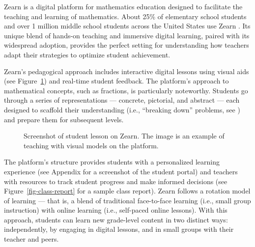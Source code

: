\documentclass[
  number,
  preprint,
  3p,
  onecolumn]{elsarticle}
\begin{document}
Zearn is a digital platform for mathematics education designed to
facilitate the teaching and learning of mathematics. About 25\% of
elementary school students and over 1 million middle school students
across the United States use Zearn \citep{post-weblog}. Its unique blend
of hands-on teaching and immersive digital learning, paired with its
widespread adoption, provides the perfect setting for understanding how
teachers adapt their strategies to optimize student achievement.

Zearn's pedagogical approach includes interactive digital lessons using
visual aids (see Figure~\ref{fig-zearn-poster}) and real-time student
feedback. The platform's approach to mathematical concepts, such as
fractions, is particularly noteworthy. Students go through a series of
representations --- concrete, pictorial, and abstract --- each designed
to scaffold their understanding (i.e., ``breaking down'' problems, see
\citep{jumaat2014, reiser2014}) and prepare them for subsequent levels.

\begin{figure}


\caption{\label{fig-zearn-poster}Screenshot of student lesson on Zearn.
The image is an example of teaching with visual models on the platform.}

\end{figure}%

The platform's structure provides students with a personalized learning
experience (see Appendix for a screenshot of the student portal) and
teachers with resources to track student progress and make informed
decisions (see Figure~\ref{fig-class-report} for a sample class report).
Zearn follows a rotation model of learning --- that is, a blend of
traditional face-to-face learning (i.e., small group instruction) with
online learning (i.e., self-paced online lessons). With this approach,
students can learn new grade-level content in two distinct ways:
independently, by engaging in digital lessons, and in small groups with
their teacher and peers.
\end{document}
